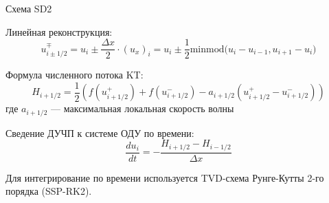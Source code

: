 \documentclass[ignoreonframetext,unicode,aspectratio=169]{beamer}
\begin{document}
%		
%		
	
	
	\begin{frame}{Схема SD2}
		\begin{block}{Линейная реконструкция:}
			\begin{equation*}
				u^\mp_{i\pm1/2} = u_i \pm \frac{\Delta x}{2} \cdot (u_x)_i = u_i \pm \frac{1}{2} \text{minmod}\big( u_i - u_{i-1}, u_{i+1} - u_i \big)
			\end{equation*}
		\end{block}
		
		\vspace{- 0.2 cm}
		\begin{block}{Формула численного потока KT:}
			\begin{equation*}
				H_{i+1/2} = \frac{1}{2}\left( f(u^+_{i+1/2}) + f(u^-_{i+1/2}) - a_{i+1/2} \left( u^+_{i+1/2} - u^-_{i+1/2} \right) \right)
			\end{equation*}
			где $a_{i+1/2}$ — максимальная локальная скорость волны
		\end{block}
		
		\vspace{- 0.2 cm}
		\begin{block}{Сведение ДУЧП к системе ОДУ по времени:}
			\begin{equation*}
				\frac{d u_i}{dt} = -\frac{ H_{i+1/2} - H_{i-1/2} }{\Delta x} 
			\end{equation*}
		\end{block}
		
		\vspace{- 0.2 cm}
		\begin{block}{}
			Для интегрирование по времени используется TVD-схема Рунге-Кутты 2-го порядка (SSP-RK2).
		\end{block}
	\end{frame}
	
\end{document}
